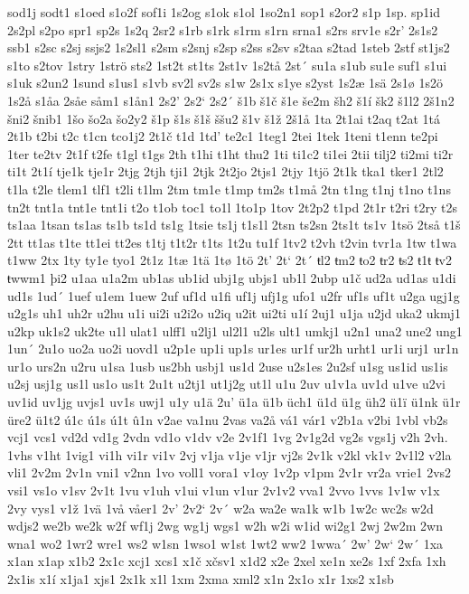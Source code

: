 sod1j
sodt1
s1oed
s1o2f
sof1i
1s2og
s1ok
s1ol
1so2n1
sop1
s2or2
s1p
1sp.
sp1id
2s2pl
s2po
spr1
sp2s
1s2q
2sr2
s1rb
s1rk
s1rm
s1rn
srna1
s2rs
srv1e
s2r'
2s1s2
ssb1
s2sc
s2sj
ssjs2
1s2sl1
s2sm
s2snj
s2sp
s2ss
s2sv
s2taa
s2tad
1steb
2stf
st1js2
s1to
s2tov
1stry
1strö
sts2
1st2t
st1ts
2st1v
1s2tå
2st´
su1a
s1ub
su1e
suf1
s1ui
s1uk
s2un2
1sund
s1us1
s1vb
sv2l
sv2s
s1w
2s1x
s1ye
s2yst
1s2æ
1sä
2s1ø
1s2ö
1s2å
s1åa
2såe
såm1
s1ån1
2s2'
2s2`
2s2´
š1b
š1č
š1e
še2m
šh2
š1í
šk2
š1l2
2š1n2
šni2
šnib1
1šo
šo2a
šo2y2
š1p
š1s
š1š
ššu2
š1v
š1ž
2š1å
1ta
2t1ai
t2aq
t2at
1tá
2t1b
t2bi
t2c
t1cn
tco1j2
2t1č
t1d
1td'
te2c1
1teg1
2tei
1tek
1teni
t1enn
te2pi
1ter
te2tv
2t1f
t2fe
t1gl
t1gs
2th
t1hi
t1ht
thu2
1ti
ti1c2
ti1ei
2tii
tilj2
ti2mi
ti2r
ti1t
2t1í
tje1k
tje1r
2tjg
2tjh
tji1
2tjk
2t2jo
2tjs1
2tjy
1tjö
2t1k
tka1
tker1
2tl2
t1la
t2le
tlem1
tlf1
t2li
t1lm
2tm
tm1e
t1mp
tm2s
t1må
2tn
t1ng
t1nj
t1no
t1ns
tn2t
tnt1a
tnt1e
tnt1i
t2o
t1ob
toc1
to1l
1to1p
1tov
2t2p2
t1pd
2t1r
t2ri
t2ry
t2s
ts1aa
1tsan
ts1as
ts1b
ts1d
ts1g
1tsie
ts1j
t1s1l
2tsn
ts2sn
2ts1t
ts1v
1tsö
2tså
t1š
2tt
tt1as
t1te
tt1ei
tt2es
t1tj
t1t2r
t1ts
1t2u
tu1f
1tv2
t2vh
t2vin
tvr1a
1tw
t1wa
t1ww
2tx
1ty
ty1e
tyo1
2t1z
1tæ
1tä
1tø
1tö
2t'
2t`
2t´
ŧl2
ŧm2
ŧo2
ŧr2
ŧs2
ŧ1ŧ
ŧv2
ŧwwm1
þi2
u1aa
u1a2m
ub1as
ub1id
ubj1g
ubjs1
ub1l
2ubp
u1č
ud2a
ud1as
u1di
ud1s
1ud´
1uef
u1em
1uew
2uf
uf1d
u1fi
uf1j
ufj1g
ufo1
u2fr
uf1s
uf1t
u2ga
ugj1g
u2g1s
uh1
uh2r
u2hu
u1i
ui2i
u2i2o
u2iq
u2it
ui2ti
u1í
2uj1
u1ja
u2jd
uka2
ukmj1
u2kp
uk1s2
uk2te
u1l
ulat1
ulff1
u2lj1
ul2l1
u2ls
ult1
umkj1
u2n1
una2
une2
ung1
1un´
2u1o
uo2a
uo2i
uovd1
u2p1e
up1i
up1s
ur1es
ur1f
ur2h
urht1
ur1i
urj1
ur1n
ur1o
urs2n
u2ru
u1sa
1usb
us2bh
usbj1
us1d
2use
u2s1es
2u2sf
u1sg
us1id
us1is
u2sj
usj1g
us1l
us1o
us1t
2u1t
u2tj1
ut1j2g
ut1l
u1u
2uv
u1v1a
uv1d
u1ve
u2vi
uv1id
uv1jg
uvjs1
uv1s
uwj1
u1y
u1ä
2u'
ü1a
ü1b
üch1
ü1d
ü1g
üh2
ü1ï
ü1nk
ü1r
üre2
ü1t2
ú1c
ú1s
ú1t
û1n
v2ae
va1nu
2vas
va2å
vá1
vár1
v2b1a
v2bi
1vbl
vb2s
vcj1
vcs1
vd2d
vd1g
2vdn
vd1o
v1dv
v2e
2v1f1
1vg
2v1g2d
vg2s
vgs1j
v2h
2vh.
1vhs
v1ht
1vig1
vi1h
vi1r
vi1v
2vj
v1ja
v1je
v1jr
vj2s
2v1k
v2kl
vk1v
2v1l2
v2la
vli1
2v2m
2v1n
vni1
v2nn
1vo
voll1
vora1
v1oy
1v2p
v1pm
2v1r
vr2a
vrie1
2vs2
vsi1
vs1o
v1sv
2v1t
1vu
v1uh
v1ui
v1un
v1ur
2v1v2
vva1
2vvo
1vvs
1v1w
v1x
2vy
vys1
v1ž
1vä
1vå
våer1
2v'
2v2`
2v´
w2a
wa2e
wa1k
w1b
1w2c
wc2s
w2d
wdjs2
we2b
we2k
w2f
wf1j
2wg
wg1j
wgs1
w2h
w2i
w1id
wi2g1
2wj
2w2m
2wn
wna1
wo2
1wr2
wre1
ws2
w1sn
1wso1
w1st
1wt2
ww2
1wwa´
2w'
2w`
2w´
1xa
x1an
x1ap
x1b2
2x1c
xcj1
xcs1
x1č
xčsv1
x1d2
x2e
2xel
xe1n
xe2s
1xf
2xfa
1xh
2x1is
x1í
x1ja1
xjs1
2x1k
x1l
1xm
2xma
xml2
x1n
2x1o
x1r
1xs2
x1sb
